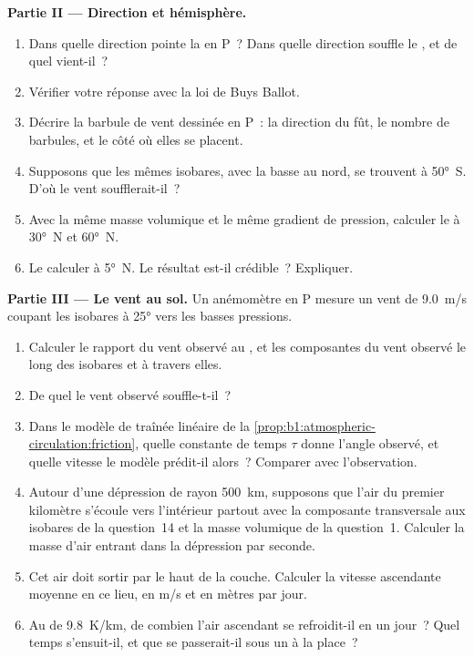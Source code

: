\begin{problem}
\medskip
\noindent\textbf{Partie II --- Direction et hémisphère.}
\begin{enumerate}[resume]
  \item Dans quelle direction pointe la  en P~? Dans quelle
        direction souffle le , et de quel 
        vient-il~?
  \item Vérifier votre réponse avec la loi de Buys Ballot.
  \item Décrire la barbule de vent dessinée en P~: la direction du fût, le nombre
        de barbules, et le côté où elles se placent.
  \item Supposons que les mêmes isobares, avec la basse au nord, se trouvent à
        \ang{50}~S. D'où le vent soufflerait-il~?
  \item Avec la même masse volumique et le même gradient de pression, calculer le 
        à \ang{30}~N et \ang{60}~N.
  \item Le calculer à \ang{5}~N. Le résultat est-il crédible~? Expliquer.
\end{enumerate}

\medskip
\noindent\textbf{Partie III --- Le vent au sol.} Un anémomètre en P mesure un
vent de \qty{9.0}{m/s} coupant les isobares à \ang{25} vers les basses pressions.
\begin{enumerate}[resume]
  \item Calculer le rapport du vent observé au , et les
        composantes du vent observé le long des isobares et à travers elles.
  \item De quel  le vent observé souffle-t-il~?
  \item Dans le modèle de traînée linéaire de la \cref{prop:b1:atmospheric-circulation:friction},
        quelle constante de temps $\tau$ donne l'angle observé, et quelle vitesse le
        modèle prédit-il alors~? Comparer avec l'observation.
  \item Autour d'une dépression de rayon \qty{500}{km}, supposons que l'air du
        premier kilomètre s'écoule vers l'intérieur partout avec la composante transversale aux isobares
        de la question~14 et la masse volumique de la question~1. Calculer la masse d'air
        entrant dans la dépression par seconde.
  \item Cet air doit sortir par le haut de la couche. Calculer la vitesse ascendante moyenne
        en ce lieu, en \unit{m/s} et en mètres par jour.
  \item Au  de \qty{9.8}{K/km}, de combien l'air
        ascendant se refroidit-il en un jour~? Quel temps s'ensuit-il, et que se passerait-il
        sous un  à la place~?
\end{enumerate}


\end{problem}
